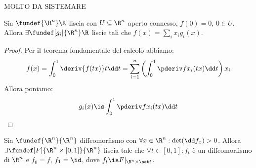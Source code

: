 
MOLTO DA SISTEMARE

\begin{lemma}
	\label{th:lemprec}
	Sia $\fundef{\R^n}\R$ liscia con $U\subseteq\R^n$ aperto connesso, $f(0)=0$, $0\in U$.
	Allora $\exists\fundef[g_i]{\R^n}\R$ liscie tali che $f(x)=\sum_ix_ig_i(x)$.
\end{lemma}

\begin{proof}
	Per il teorema fondamentale del calcolo abbiamo:
	\[f(x)=\int_0^1\deriv{f(tx)}t\dd t=
	\sum_{i=1}^n\left(\int_0^1\pderiv f{x_i}(tx)\dd t\right)x_i\]
	Allora poniamo:
	\[g_i(x)\is\int_0^1\pderiv f{x_i}(tx)\dd t
	\qedhere\]
\end{proof}

\begin{teo}
	Sia $\fundef{\R^n}{\R^n}$ diffeomorfismo con $\forall x\in\R^n:\det(\dd f_{x})>0$. Allora $\exists\fundef[F]{\R^n\times[0,1]}{\R^n}$ liscia tale che $\forall t\in[0,1]:f_t$ è un diffeomorfismo di $\R^n$ e $f_0=f$, $f_1=\id$, dove $f_t\is F|_{\R^n\times\set t}$.
\end{teo}

